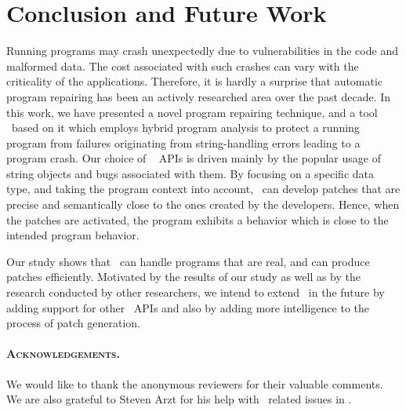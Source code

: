 \section{Conclusion and Future Work}
\label{sec:conc}

Running programs may crash unexpectedly due to vulnerabilities in the code and
malformed data.
The cost associated with such crashes can vary with the criticality of the
applications. Therefore, it is hardly a surprise that automatic program
repairing has been an actively researched area over the past decade.
In this work, we have presented a novel program repairing technique, and a tool
\tool\ based on it which employs hybrid program analysis to protect a running
program from failures originating from string-handling errors leading to a
program crash.
Our choice of \java\  APIs is driven mainly by the popular usage of
string objects and bugs associated with them.
By focusing on a specific data type, and taking the program context into
account, \tool\ can develop patches that are precise and  semantically close to
the ones created by the developers.
Hence, when the patches are activated, the program exhibits a behavior which is
close to the intended program behavior.

Our study shows that \tool\ can handle programs that are real, and can produce
patches efficiently. Motivated by the results of our study as well as by the
research conducted by other researchers, we intend to extend \tool\ in the
future by adding support for other \java\ APIs and also by adding more
intelligence to the process of patch generation.

\paragraph{\textsc{Acknowledgements.}} %
We would like to thank the anonymous reviewers for their valuable comments. We
are also grateful to Steven Arzt for his help with \soot\ related issues in
\tool.
